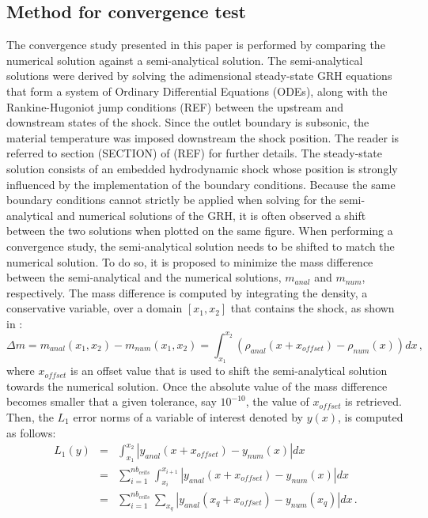 \documentclass[times,doublespace]{fldauth}%
\begin{document}
\subsection{Method for convergence test}\label{sec:mthd-conv-test}
%
The convergence study presented in this paper is performed by comparing the numerical solution against a semi-analytical solution. The semi-analytical solutions were derived by solving the adimensional steady-state GRH equations that form a system of Ordinary Differential Equations (ODEs), along with the Rankine-Hugoniot jump conditions (REF) between the upstream and downstream states of the shock. Since the outlet boundary is subsonic, the material temperature was imposed downstream the shock position. The reader is referred to section (SECTION) of (REF) for further details. The steady-state solution consists of an embedded hydrodynamic shock whose position is strongly influenced by the implementation of the boundary conditions. Because the same boundary conditions cannot strictly be applied when solving for the semi-analytical and numerical solutions of the GRH, it is often observed a shift between the two solutions when plotted on the same figure. When performing a convergence study, the semi-analytical solution needs to be shifted to match the numerical solution. To do so, it is proposed to minimize the mass difference between the semi-analytical and the numerical solutions, $m_{anal}$ and $m_{num}$, respectively. The mass difference is computed by integrating the density, a conservative variable, over a domain $[x_1, x_2]$ that contains the shock, as shown in :
%
\begin{equation}\label{eq:mass-diff}
\Delta m = m_{anal}(x_1,x_2) - m_{num}(x_1,x_2) = \int_{x_1}^{x_2} \left( \rho_{anal} (x+x_{offset}) - \rho_{num} (x)\right) dx \, ,
\end{equation}
%
where $x_{offset}$ is an offset value that is used to shift the semi-analytical solution towards the numerical solution. Once the absolute value of the mass difference becomes smaller that a given tolerance, say $10^{-10}$, the value of $x_{offset}$ is retrieved. Then, the $L_1$ error norms of a variable of interest denoted by $y(x)$, is computed as follows:
%
\begin{eqnarray}\label{eq:l1-error-norm}
L_1(y) &=& \int_{x_1}^{x_2} | y_{anal}(x+x_{offset}) - y_{num}(x) | dx \\ 
&=& \sum_{i=1}^{nb_{cells}} \int_{x_i}^{x_{i+1}} | y_{anal}(x+x_{offset}) - y_{num}(x) | dx \\
&=& \sum_{i=1}^{nb_{cells}} \sum_{x_q} | y_{anal}(x_q+x_{offset}) - y_{num}(x_q) | dx \, .
\end{eqnarray}
\end{document}
